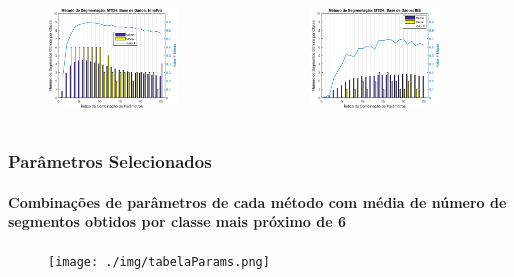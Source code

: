 \documentclass{beamer}
\begin{document}
\begin{frame}
\begin{columns}[c]
			\begin{figure}
				\begin{center}
					\includegraphics[width=0.8\textwidth]{./img/mtd4_nina.eps}
				\end{center}
			\end{figure}
			\begin{figure}
				\begin{center}
					\includegraphics[width=0.8\textwidth]{./img/mtd4_iee.eps}
				\end{center}
			\end{figure}
			
		\end{columns}
	\end{frame}
	
	\begin{frame}
		\frametitle{Parâmetros Selecionados}
		\framesubtitle{Combinações de parâmetros de cada método com média de número de segmentos obtidos por classe mais próximo de 6}
		
		\begin{figure}
			\begin{center}
				\texttt{[image: ./img/tabelaParams.png]}
			\end{center}
		\end{figure}

	\end{frame}
	
\end{document}
